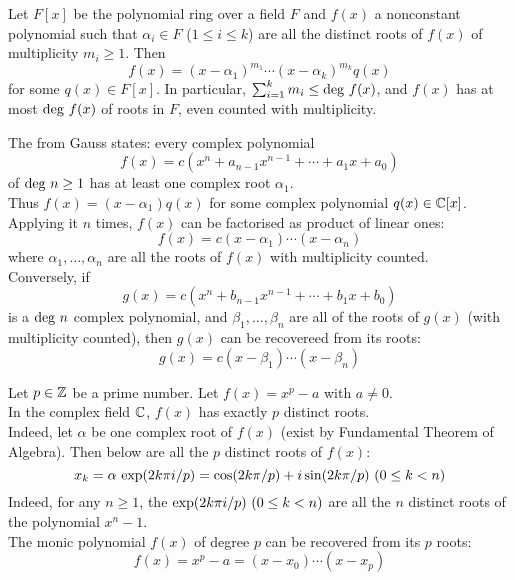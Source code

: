 \begin{proposition}
Let $F[x]$ be the polynomial ring over a field $F$ and $f(x)$ a nonconstant polynomial such that $\alpha_i \in F$ ($1 \leq i \leq k$) are all the distinct roots of $f(x)$ of multiplicity $m_i \geq 1$. Then
\begin{equation}
f(x) = (x-\alpha_1)^{m_1} \cdots (x-\alpha_k)^{m_k} q(x) \nonumber
\end{equation}
for some $q(x) \in F[x]$. In particular, $\sum_{i=1}^{k} m_i \leq \textnormal{deg}\ f(x)$, and $f(x)$ has at most $\textnormal{deg}\ f(x)$ of roots in $F$, even counted with multiplicity.
\end{proposition}

\begin{remark}
The  from Gauss states: every complex polynomial
\begin{equation}
f(x) = c(x^n + a_{n-1} x^{n-1} + \cdots + a_1 x + a_0) \nonumber
\end{equation}
of $\textnormal{deg}\ n \geq 1$ has at least one complex root $\alpha_1$. \\
Thus $f(x) = (x-\alpha_1)q(x)$ for some complex polynomial $q(x) \in \mathbb{C}[x]$.\\
Applying it $n$ times, $f(x)$ can be factorised as product of linear ones:
\begin{equation}
f(x) = c(x-\alpha_1)\cdots (x-\alpha_n) \nonumber
\end{equation}
where $\alpha_1, \ldots, \alpha_n$ are all the roots of $f(x)$ with multiplicity counted.\\
Conversely, if
\begin{equation}
g(x) = c(x^n + b_{n-1} x^{n-1} + \cdots + b_1 x + b_0) \nonumber
\end{equation}	
is a $\textnormal{deg}\ n$ complex polynomial, and $\beta_1, \ldots, \beta_n$ are all of the roots of $g(x)$ (with multiplicity counted), then $g(x)$ can be recovereed from its roots:
\begin{equation}
g(x) = c(x-\beta_1)\cdots (x-\beta_n) \nonumber
\end{equation}
\end{remark}

\begin{remark}
Let $p \in \mathbb{Z}$ be a prime number. Let $f(x) = x^p - a$ with $a \neq 0$.\\
In the complex field $\mathbb{C}$, $f(x)$ has exactly $p$ distinct roots.\\
Indeed, let $\alpha$ be one complex root of $f(x)$ (exist by Fundamental Theorem of Algebra). Then below are all the $p$ distinct roots of $f(x)$:
\begin{equation}
x_k = \alpha \ \textnormal{exp}(2k \pi i / p) = \cos(2k \pi / p) + i \sin(2k \pi / p) \ (0\leq k < n) \nonumber
\end{equation}
Indeed, for any $n \geq 1$, the $\textnormal{exp}(2k \pi i / p) \ (0\leq k < n)$ are all the $n$ distinct roots of the polynomial $x^n - 1$.\\
The monic polynomial $f(x)$ of degree $p$ can be recovered from its $p$ roots:
\begin{equation}
f(x) = x^p - a = (x-x_0) \cdots (x-x_p) \nonumber
\end{equation}
\end{remark}

